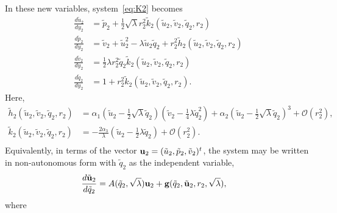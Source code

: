 \documentclass[11pt]{article}
\numberwithin{equation}{section}
\begin{document}
In these new variables, system~\eqref{eq:K2} becomes
\begin{equation}
    \begin{split}
\frac{d\tilde{u}_2}{dy_2} &= \tilde{p}_2 + \frac{1}{2} \sqrt{\lambda} r_2^2 \tilde{k}_2(\tilde{u}_2,\tilde{v}_2,\tilde{q}_2,r_2) \\
\frac{d\tilde{p}_2}{dy_2} &= \tilde{v}_2 + \tilde{u}_2^2 - \lambda \tilde{u}_2 \tilde{q}_2 + r_2^2 \tilde{h}_2(\tilde{u}_2,\tilde{v}_2,\tilde{q}_2,r_2) \\
\frac{d\tilde{v}_2}{dy_2} &= \frac{1}{2} \lambda r_2^2 \tilde{q}_2 \tilde{k}_2(\tilde{u}_2,\tilde{v}_2,\tilde{q}_2,r_2) \\
\frac{d\tilde{q}_2}{dy_2} &= 1 + r_2^2 \tilde{k}_2(\tilde{u}_2,\tilde{v}_2,\tilde{q}_2,r_2).
    \end{split}
\end{equation}
Here,
\begin{equation*}
    \begin{split}
    \tilde{h}_2 (\tilde{u}_2,\tilde{v}_2,\tilde{q}_2,r_2) 
    &= \alpha_1 \left( \tilde{u}_2 - \frac{1}{2}\sqrt{\lambda} \tilde{q}_2\right)\left(\tilde{v}_2 - \frac{1}{4} \lambda \tilde{q}_2^2\right) 
    +\alpha_2 \left(\tilde{u}_2 - \frac{1}{2}\sqrt{\lambda} \tilde{q}_2\right)^3 + \mathcal{O}(r_2^2),\\
     \tilde{k}_2 (\tilde{u}_2,\tilde{v}_2,\tilde{q}_2,r_2) 
    &= -\frac{2\alpha_3}{\lambda}  \left( \tilde{u}_2 - \frac{1}{2}\lambda \tilde{q}_2\right)
    + \mathcal{O}(r_2^2).\\
    \end{split}
\end{equation*}
%
Equivalently, in terms of the vector ${\bf u}_2= (\tilde{u}_2,\tilde{p}_2,\tilde{v}_2)^t$, the system may be written in non-autonomous form with $\tilde{q}_2$ as the independent variable,
\begin{equation}\label{eq:nonauto}
    \begin{split}
\frac{d\tilde{\bf{u}}_2}{d\tilde{q}_2} &= 
A(\tilde{q}_2,\sqrt{\lambda}) {\bf u}_2 + {\bf g} (\tilde{q}_2,\tilde{\bf u}_2,r_2, \sqrt{\lambda}),
    \end{split}
\end{equation}
where
\end{document}
